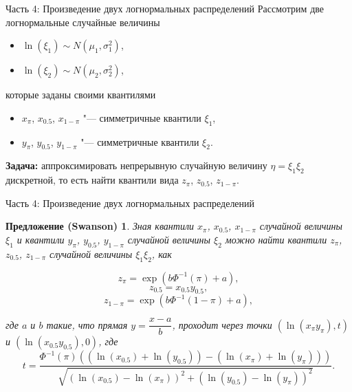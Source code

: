 \documentclass[ucs, notheorems, handout]{beamer}
\newtheorem{proposition}[theorem]{Предложение (Swanson)}
\begin{document}
	\begin{frame}{Часть 4: Произведение двух логнормальных распределений}
		Рассмотрим две логнормальные случайные величины
		\begin{itemize}
			\item $\ln(\xi_{1}) \sim N(\mu_{1}, \sigma _{1}^{2})$,
			\item $\ln(\xi_{2}) \sim N(\mu_{2}, \sigma _{2}^{2})$,
		\end{itemize}
		которые заданы своими квантилями
		\begin{itemize}
			\item $x_{\pi}$, $x_{0.5}$, $x_{1-\pi}$ "--- симметричные квантили $\xi_{1}$,
			\item $y_{\pi}$, $y_{0.5}$, $y_{1-\pi}$ "--- симметричные квантили $\xi_{2}$.
		\end{itemize}
	
		\bigskip
		
		\textbf{Задача:} аппроксимировать непрерывную случайную величину $\eta = \xi_{1}\xi_{2}$ дискретной, то есть найти квантили вида $z_{\pi}$, $z_{0.5}$, $z_{1-\pi}$.
		
	\end{frame}

	\begin{frame}{Часть 4: Произведение двух логнормальных распределений}
	
		\begin{proposition}
		Зная квантили $x_{\pi}$, $x_{0.5}$, $x_{1-\pi}$ случайной величины $\xi_{1}$ и квантили $y_{\pi}$, $y_{0.5}$, $y_{1-\pi}$ случайной величины $\xi_{2}$ можно найти квантили $z_{\pi}$, $z_{0.5}$, $z_{1-\pi}$ случайной величины $\xi_{1}\xi_{2}$, как
		
		\begin{equation*}
			z_{\pi}=\exp(b\Phi^{-1}(\pi)+a),
		\end{equation*}
		\begin{equation*}
			z_{0.5}=x_{0.5}y_{0.5},
		\end{equation*}
		\begin{equation*}
			z_{1-\pi}=\exp(b\Phi^{-1}(1-\pi)+a),
		\end{equation*}
		
		где $a$ и $b$ такие, что прямая $y=\dfrac{x-a}{b}$, проходит через точки $(\ln(x_{\pi}y_{\pi}), t)$ и $(\ln(x_{0.5}y_{0.5}),0)$, где
		\begin{equation*}
			t = \frac{\Phi^{-1}(\pi)((\ln(x_{0.5})+\ln(y_{0.5}))-(\ln(x_{\pi})+\ln(y_{\pi})))}{\sqrt{(\ln(x_{0.5})-\ln(x_{\pi}))^{2}+(\ln(y_{0.5})-\ln(y_{\pi}))^{2}}}. 
		\end{equation*}
	\end{proposition}
\end{frame}
\end{document}
